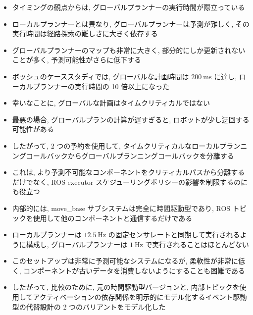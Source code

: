 \begin{frame}{}
    \begin{itemize}
        \item タイミングの観点からは, グローバルプランナーの実行時間が際立っている
\item ローカルプランナーとは異なり, グローバルプランナーは予測が難しく, その実行時間は経路探索の難しさに大きく依存する
\item グローバルプランナーのマップも非常に大きく, 部分的にしか更新されないことが多く, 予測可能性がさらに低下する
\item ボッシュのケーススタディでは, グローバルな計画時間は $200 \mathrm{~ms}$ に達し, ローカルプランナーの実行時間の 10 倍以上になった
\item 幸いなことに, グローバルな計画はタイムクリティカルではない
\item 最悪の場合, グローバルプランの計算が遅すぎると, ロボットが少し迂回する可能性がある
\item したがって, 2 つの予約を使用して, タイムクリティカルなローカルプランニングコールバックからグローバルプランニングコールバックを分離する
\item これは, より予測不可能なコンポーネントをクリティカルパスから分離するだけでなく, ROS executor スケジューリングポリシーの影響を制限するのにも役立つ
    \end{itemize}
\end{frame}

\begin{frame}{}
    \begin{itemize}
        \item 内部的には, move\_base サブシステムは完全に時間駆動型であり, ROS トピックを使用して他のコンポーネントと通信するだけである
\item ローカルプランナーは $12.5 \mathrm{~Hz}$ の固定センサレートと同期して実行されるように構成し, グローバルプランナーは $1 \mathrm{~Hz}$ で実行されることはほとんどない
\item このセットアップは非常に予測可能なシステムになるが, 柔軟性が非常に低く, コンポーネントが古いデータを消費しないようにすることも困難である
\item したがって, 比較のために, 元の時間駆動型バージョンと, 内部トピックを使用してアクティベーションの依存関係を明示的にモデル化するイベント駆動型の代替設計の 2 つのバリアントをモデル化した
    \end{itemize}
\end{frame}

